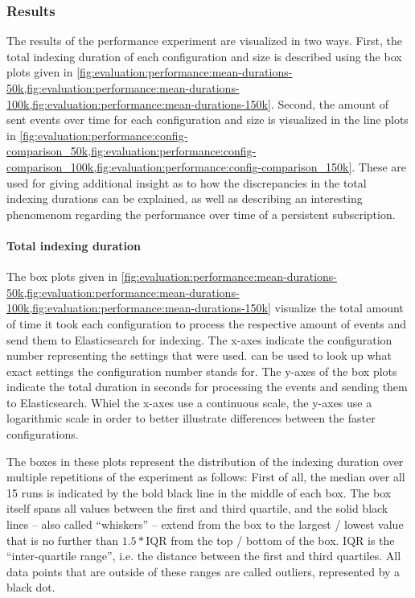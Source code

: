 \subsubsection{Results}

The results of the performance experiment are visualized in two ways.
First, the total indexing duration of each configuration and size is described using the box plots given in \cref{fig:evaluation:performance:mean-durations-50k,fig:evaluation:performance:mean-durations-100k,fig:evaluation:performance:mean-durations-150k}.
Second, the amount of sent events over time for each configuration and size is visualized in the line plots in \cref{fig:evaluation:performance:config-comparison_50k,fig:evaluation:performance:config-comparison_100k,fig:evaluation:performance:config-comparison_150k}.
These are used for giving additional insight as to how the discrepancies in the total indexing durations can be explained, as well as describing an interesting phenomenom regarding the performance over time of a persistent subscription.

\paragraph{Total indexing duration}

The box plots given in \cref{fig:evaluation:performance:mean-durations-50k,fig:evaluation:performance:mean-durations-100k,fig:evaluation:performance:mean-durations-150k} visualize the total amount of time it took each configuration to process the respective amount of events and send them to Elasticsearch for indexing.
The x-axes indicate the configuration number representing the settings that were used.
 can be used to look up what exact settings the configuration number stands for.
The y-axes of the box plots indicate the total duration in seconds for processing the events and sending them to Elasticsearch.
Whiel the x-axes use a continuous scale, the y-axes use a logarithmic scale in order to better illustrate differences between the faster configurations.

The boxes in these plots represent the distribution of the indexing duration over multiple repetitions of the experiment as follows:
First of all, the median over all 15 runs is indicated by the bold black line in the middle of each box.
The box itself spans all values between the first and third quartile, and the solid black lines -- also called ``whiskers'' -- extend from the box to the largest / lowest value that is no further than $ 1.5 * \text{IQR} $ from the top / bottom of the box.
$\text{IQR}$ is the ``inter-quartile range'', i.e. the distance between the first and third quartiles.
All data points that are outside of these ranges are called outliers, represented by a black dot.


